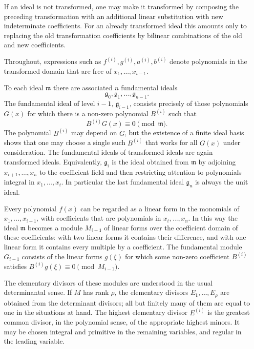 \documentclass[11pt]{article}
\begin{document}
If an ideal is not transformed, one may make it transformed by composing the preceding transformation with an additional linear substitution with new indeterminate coefficients. For an already transformed ideal this amounts only to replacing the old transformation coefficients by bilinear combinations of the old and new coefficients.

Throughout, expressions such as $f^{(i)},g^{(i)},a^{(i)},b^{(i)}$ denote polynomials in the transformed domain that are free of $x_1,\ldots,x_{i-1}$.

To each ideal $\mathfrak m$ there are associated $n$ fundamental ideals
\[
  \mathfrak g_0,\mathfrak g_1,\ldots,\mathfrak g_{n-1}.
\]
The fundamental ideal of level $i-1$, $\mathfrak g_{i-1}$, consists precisely of those polynomials $G(x)$ for which there is a non-zero polynomial $B^{(i)}$ such that
\[
  B^{(i)}G(x)\equiv 0 \pmod{\mathfrak m}.
\]
The polynomial $B^{(i)}$ may depend on $G$, but the existence of a finite ideal basis shows that one may choose a single such $B^{(i)}$ that works for all $G(x)$ under consideration. The fundamental ideals of transformed ideals are again transformed ideals. Equivalently, $\mathfrak g_i$ is the ideal obtained from $\mathfrak m$ by adjoining $x_{i+1},\ldots,x_n$ to the coefficient field and then restricting attention to polynomials integral in $x_1,\ldots,x_i$. In particular the last fundamental ideal $\mathfrak g_n$ is always the unit ideal.

Every polynomial $f(x)$ can be regarded as a linear form in the monomials of $x_1,\ldots,x_{i-1}$, with coefficients that are polynomials in $x_i,\ldots,x_n$. In this way the ideal $\mathfrak m$ becomes a module $M_{i-1}$ of linear forms over the coefficient domain of these coefficients: with two linear forms it contains their difference, and with one linear form it contains every multiple by a coefficient. The fundamental module $G_{i-1}$ consists of the linear forms $g(\xi)$ for which some non-zero coefficient $B^{(i)}$ satisfies $B^{(i)}g(\xi)\equiv0\pmod{M_{i-1}}$.

The elementary divisors of these modules are understood in the usual determinantal sense. If $M$ has rank $\rho$, the elementary divisors $E_1,\ldots,E_\rho$ are obtained from the determinant divisors; all but finitely many of them are equal to one in the situations at hand. The highest elementary divisor $E^{(i)}$ is the greatest common divisor, in the polynomial sense, of the appropriate highest minors. It may be chosen integral and primitive in the remaining variables, and regular in the leading variable.
\end{document}

